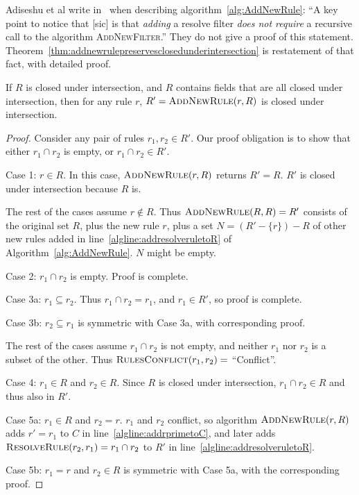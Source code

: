 \documentclass[acmsmall]{acmart}
\begin{document}
Adiseshu et al write in~\cite[Sec. 4.1]{ASP1999} when describing
algorithm~\ref{alg:AddNewRule}:
``A key point to notice that [sic] is that
{\em adding} a resolve filter
{\em does not require} a recursive call to the algorithm
\textsc{AddNewFilter}.''
They do not give a proof of this statement.
Theorem~\ref{thm:addnewrulepreservesclosedunderintersection}
is restatement of that fact, with detailed proof.

\begin{theorem}
\label{thm:addnewrulepreservesclosedunderintersection}
If $R$ is closed under intersection,
and $R$ contains fields that are all closed under intersection,
then for any rule $r$,
$R' = \mathbin{\textsc{AddNewRule}({r},{R})}$ is closed under intersection.
\end{theorem}

\begin{proof}
Consider any pair of rules $r_1, r_2 \in R'$.
Our proof obligation is to show that
either $r_1 \cap r_2$ is empty, or $r_1 \cap r_2 \in R'$.

Case 1: $r \in R$.  In this case, $\mathbin{\textsc{AddNewRule}({r},{R})}$ returns $R' = R$.
$R'$ is closed under intersection because $R$ is.

The rest of the cases assume $r \not\in R$.
Thus $\mathbin{\textsc{AddNewRule}({R},{R})} = R'$ consists of the original set $R$,
plus the new rule $r$,
plus a set $N=(R'-\{r\})-R$ of other new rules added
in line~\ref{algline:addresolveruletoR}
of Algorithm~\ref{alg:AddNewRule}.
$N$ might be empty.

Case 2: $r_1 \cap r_2$ is empty.  Proof is complete.

Case 3a: $r_1 \subseteq r_2$.
Thus $r_1 \cap r_2 = r_1$, and $r_1 \in R'$, so proof is complete.

Case 3b: $r_2 \subseteq r_1$ is symmetric with Case 3a,
with corresponding proof.

The rest of the cases assume $r_1 \cap r_2$ is not empty,
and neither $r_1$ nor $r_2$ is a subset of the other.
Thus $\mathbin{\textsc{RulesConflict}({r_1},{r_2})} = $ ``Conflict''.

Case 4: $r_1 \in R$ and $r_2 \in R$.
Since $R$ is closed under intersection, $r_1 \cap r_2 \in R$
and thus also in $R'$.

Case 5a: $r_1 \in R$ and $r_2 = r$.
$r_1$ and $r_2$ conflict,
so algorithm $\mathbin{\textsc{AddNewRule}({r},{R})}$ adds $r'=r_1$ to $C$
in line~\ref{algline:addrprimetoC},
and later adds $\mathbin{\textsc{ResolveRule}({r_2},{r_1})} = r_1 \cap r_2$ to $R'$
in line~\ref{algline:addresolveruletoR}.

Case 5b: $r_1 = r$ and $r_2 \in R$ is symmetric with Case 5a,
with the corresponding proof.


\end{proof}
\end{document}
